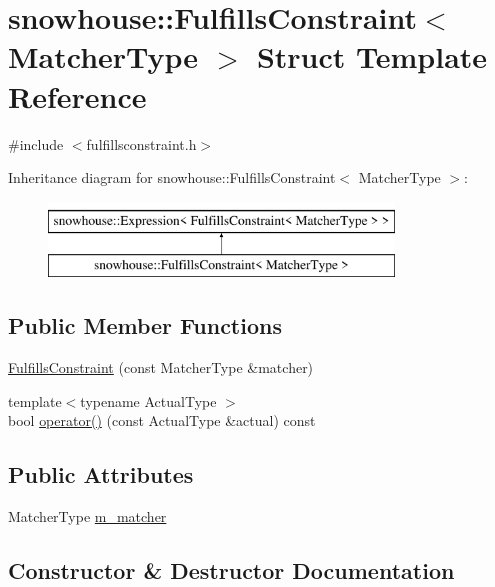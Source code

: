 \hypertarget{structsnowhouse_1_1FulfillsConstraint}{}\section{snowhouse\+::Fulfills\+Constraint$<$ Matcher\+Type $>$ Struct Template Reference}
\label{structsnowhouse_1_1FulfillsConstraint}


{\ttfamily \#include $<$fulfillsconstraint.\+h$>$}

Inheritance diagram for snowhouse\+::Fulfills\+Constraint$<$ Matcher\+Type $>$\+:\begin{figure}[H]
\begin{center}
\leavevmode
\includegraphics[height=2.000000cm]{structsnowhouse_1_1FulfillsConstraint}
\end{center}
\end{figure}
\subsection*{Public Member Functions}
\begin{DoxyCompactItemize}
\item 
\mbox{\hyperlink{structsnowhouse_1_1FulfillsConstraint_a2495f4bfb5a4c66f04dbe33f2b48856e}{Fulfills\+Constraint}} (const Matcher\+Type \&matcher)
\item 
{\footnotesize template$<$typename Actual\+Type $>$ }\\bool \mbox{\hyperlink{structsnowhouse_1_1FulfillsConstraint_a42dd02bea63bd27c2ef6147970f28f5b}{operator()}} (const Actual\+Type \&actual) const
\end{DoxyCompactItemize}
\subsection*{Public Attributes}
\begin{DoxyCompactItemize}
\item 
Matcher\+Type \mbox{\hyperlink{structsnowhouse_1_1FulfillsConstraint_a577beb7d289d5c3496b90361c463f498}{m\+\_\+matcher}}
\end{DoxyCompactItemize}


\subsection{Constructor \& Destructor Documentation}
\mbox{\label{structsnowhouse_1_1FulfillsConstraint_a2495f4bfb5a4c66f04dbe33f2b48856e}} 

